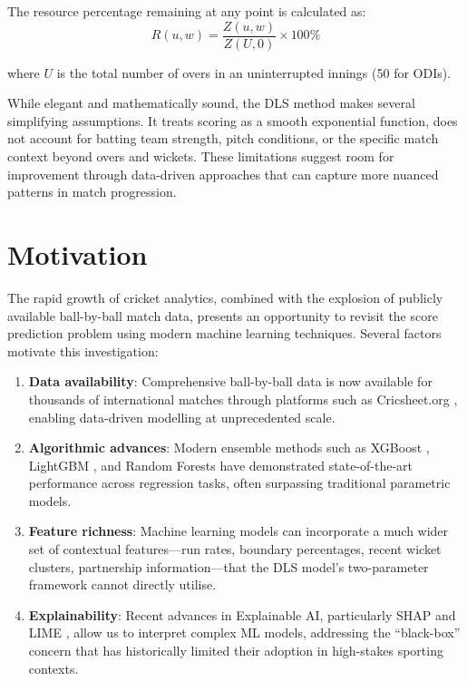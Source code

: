 \documentclass[12pt,a4paper,oneside]{report}
\begin{document}
The resource percentage remaining at any point is calculated as:
\begin{equation}
R(u, w) = \frac{Z(u, w)}{Z(U, 0)} \times 100\%
\end{equation}

\noindent where $U$ is the total number of overs in an uninterrupted innings (50 for ODIs).

While elegant and mathematically sound, the DLS method makes several simplifying assumptions. It treats scoring as a smooth exponential function, does not account for batting team strength, pitch conditions, or the specific match context beyond overs and wickets. These limitations suggest room for improvement through data-driven approaches that can capture more nuanced patterns in match progression.

\section{Motivation}

The rapid growth of cricket analytics, combined with the explosion of publicly available ball-by-ball match data, presents an opportunity to revisit the score prediction problem using modern machine learning techniques. Several factors motivate this investigation:

\begin{enumerate}
    \item \textbf{Data availability}: Comprehensive ball-by-ball data is now available for thousands of international matches through platforms such as Cricsheet.org \citep{cricsheet}, enabling data-driven modelling at unprecedented scale.

    \item \textbf{Algorithmic advances}: Modern ensemble methods such as XGBoost \citep{chen2016xgboost}, LightGBM \citep{ke2017lightgbm}, and Random Forests \citep{breiman2001random} have demonstrated state-of-the-art performance across regression tasks, often surpassing traditional parametric models.

    \item \textbf{Feature richness}: Machine learning models can incorporate a much wider set of contextual features---run rates, boundary percentages, recent wicket clusters, partnership information---that the DLS model's two-parameter framework cannot directly utilise.

    \item \textbf{Explainability}: Recent advances in Explainable AI, particularly SHAP \citep{lundberg2017unified} and LIME \citep{ribeiro2016should}, allow us to interpret complex ML models, addressing the ``black-box'' concern that has historically limited their adoption in high-stakes sporting contexts.
\end{enumerate}
\end{document}
